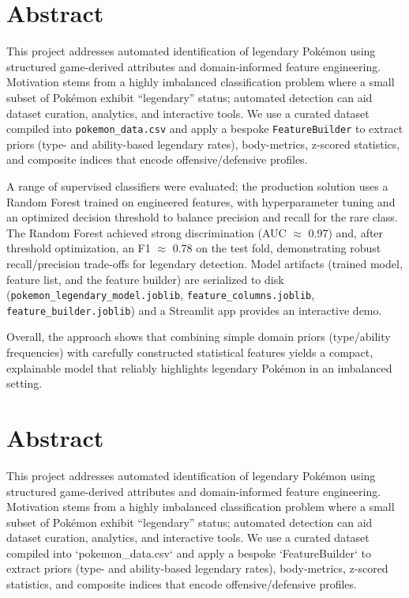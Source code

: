 \chapter*{Abstract}

This project addresses automated identification of legendary Pokémon using structured game-derived attributes and domain-informed feature engineering. Motivation stems from a highly imbalanced classification problem where a small subset of Pokémon exhibit ``legendary'' status; automated detection can aid dataset curation, analytics, and interactive tools. We use a curated dataset compiled into \texttt{pokemon\_data.csv} and apply a bespoke \texttt{FeatureBuilder} to extract priors (type- and ability-based legendary rates), body-metrics, z-scored statistics, and composite indices that encode offensive/defensive profiles.

A range of supervised classifiers were evaluated; the production solution uses a Random Forest trained on engineered features, with hyperparameter tuning and an optimized decision threshold to balance precision and recall for the rare class. The Random Forest achieved strong discrimination (AUC $\approx$ 0.97) and, after threshold optimization, an F1 $\approx$ 0.78 on the test fold, demonstrating robust recall/precision trade-offs for legendary detection. Model artifacts (trained model, feature list, and the feature builder) are serialized to disk (\texttt{pokemon\_legendary\_model.joblib}, \texttt{feature\_columns.joblib}, \texttt{feature\_builder.joblib}) and a Streamlit app provides an interactive demo.

Overall, the approach shows that combining simple domain priors (type/ability frequencies) with carefully constructed statistical features yields a compact, explainable model that reliably highlights legendary Pokémon in an imbalanced setting.
\chapter*{Abstract}

This project addresses automated identification of legendary Pokémon using structured game-derived attributes and domain-informed feature engineering. Motivation stems from a highly imbalanced classification problem where a small subset of Pokémon exhibit ``legendary'' status; automated detection can aid dataset curation, analytics, and interactive tools. We use a curated dataset compiled into `pokemon_data.csv` and apply a bespoke `FeatureBuilder` to extract priors (type- and ability-based legendary rates), body-metrics, z-scored statistics, and composite indices that encode offensive/defensive profiles.

